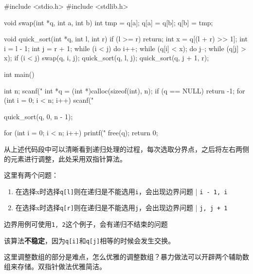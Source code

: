 \begin{mycpptwocol}
    #include <stdio.h>
    #include <stdlib.h>

    void swap(int *q, int a, int b) {
        int tmp = q[a];
        q[a] = q[b];
        q[b] = tmp;
    }

    void quick_sort(int *q, int l, int r)
        {
        if (l >= r) {
            return;
        }
        int x = q[(l + r) >> 1];
        int i = l - 1;
        int j = r + 1;
        while (i < j) {
            do i++; while (q[i] < x);
            do j--; while (q[j] > x);
            if (i < j) {
                swap(q, i, j);
            }
        }
        quick_sort(q, l, j);
        quick_sort(q, j + 1, r);
    }

    int main() {
        int n;
        scanf("%
        int *q = (int *)calloc(sizeof(int), n);
        if (q == NULL) {
            return -1;
        }
        for (int i = 0; i < n; i++) {
            scanf("%
        }

        quick_sort(q, 0, n - 1);

        for (int i = 0; i < n; i++) {
            printf("%
        }
        free(q);
        return 0;
    }
\end{mycpptwocol}

从上述代码段中可以清晰看到递归处理的过程，每次选取分界点，之后将左右两侧的元素进行调整，此处采用双指针算法。

\begin{keypoint}
    这里有两个问题：
    \begin{enumerate}
        \item 在选择x时选择\lstinline{q[l]}则在递归是不能选用\lstinline{i}，会出现边界问题 | \lstinline{i - 1, i}
        \item 在选择x时选择\lstinline{q[r]}则在递归是不能选用\lstinline{j}，会出现边界问题 | \lstinline{j, j + 1}
    \end{enumerate}

    边界用例可使用\lstinline{1, 2}这个例子，会有递归不结束的问题
\end{keypoint}

\begin{information}
    该算法\textbf{不稳定}，因为\lstinline{q[i]}和\lstinline{q[j]}相等的时候会发生交换。

    这里调整数组的部分是难点，怎么优雅的调整数组？暴力做法可以开辟两个辅助数组来存储。双指针做法优雅简洁。
\end{information}

